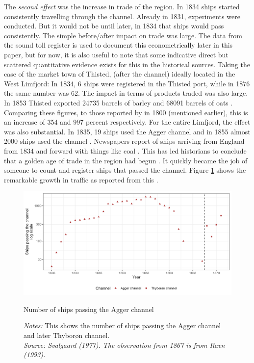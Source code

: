 \documentclass[11pt]{article}
\begin{document}
The \textit{second effect} was the increase in trade of the region. In 1834 ships started consistently travelling through the channel. Already in 1831, experiments were conducted. But it would not be until later, in 1834 that ships would pass consistently. The simple before/after impact on trade was large. The data from the sound toll register is used to document this econometrically later in this paper, but for now, it is also useful to note that some indicative direct but scattered quantitative evidence exists for this in the historical sources. Taking the case of the market town of Thisted, (after the channel) ideally located in the West Limfjord: In 1834, 6 ships were registered in the Thisted port, while in 1876 the same number was 62. The impact in terms of products traded was also large. In 1853 Thisted exported 24735 barrels of barley and 68091 barrels of oats \citep[p. 153-159]{ThistedLokalhistorie1974}. Comparing these figures, to those reported by \cite{Aagard1802} in 1800 (mentioned earlier), this is an increase of 354 and 997 percent respectively. For the entire Limfjord, the effect was also substantial. In 1835, 19 ships used the Agger channel and in 1855 almost 2000 ships used the channel \citep{Svalgaard1977}. Newspapers report of ships arriving from England from 1834 and forward with things like coal \citep{ThistedAmtsavis1834, RoskildeAmt1836, ViborgStift1852}. This has led historians to conclude that a golden age of trade in the region had begun \citep{Poulsen2019, Ravn1993}. It quickly became the job of someone to count and register ships that passed the channel. Figure \ref{fig:channel} shows the remarkable growth in traffic as reported from this \citep{Svalgaard1977}.


\begin{figure}
\begin{center}
  \includegraphics[width=1\textwidth]{Plots/Ship_trafic_channel.png}
  \caption{Number of ships passing the Agger channel} \label{fig:channel}
  \parbox{0.9\textwidth}{
    \caption*{\footnotesize \textit{Notes:} This shows the number of ships passing the Agger channel and later Thyborøn channel. \\ \textit{Source: Svalgaard (1977). The observation from 1867 is from Ravn (1993).}}
  }  
\end{center}
\end{figure}
\end{document}
